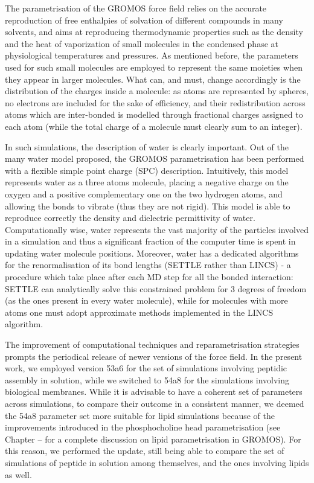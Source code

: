 The parametrisation of the GROMOS force field relies on the accurate reproduction of free enthalpies of solvation of different compounds in many solvents, and aims at reproducing thermodynamic properties such as the density and the heat of vaporization of small molecules in the condensed phase at physiological temperatures and pressures.
%
As mentioned before, the parameters used for such small molecules are employed to represent the same moieties when they appear in larger molecules. What can, and must, change accordingly is the distribution of the charges inside a molecule: as atoms are represented by spheres, no electrons are included for the sake of efficiency, and their redistribution across atoms which are inter-bonded is modelled through fractional charges assigned to each atom (while the total charge of a molecule must clearly sum to an integer).

In such simulations, the description of water is clearly important. Out of the many water model proposed, the GROMOS parametrisation has been performed with a flexible simple point charge (SPC) description. Intuitively, this model represents water as a three atoms molecule, placing a negative charge on the oxygen and a positive complementary one on the two hydrogen atoms, and allowing the bonds to vibrate (thus they are not rigid). This model is able to reproduce correctly the density and dielectric permittivity of water. Computationally wise, water represents the vast majority of the particles involved in a simulation and thus a significant fraction of the computer time is spent in updating water molecule positions.
%
Moreover, water has a dedicated algorithms for the renormalisation of its bond lengths (SETTLE rather than LINCS) - a procedure which take place after each MD step for all the bonded interaction: SETTLE can analytically solve this constrained problem for 3 degrees of freedom (as the ones present in every water molecule), while for molecules with more atoms one must adopt approximate methods implemented in the LINCS algorithm.

The improvement of computational techniques and reparametrisation strategies prompts the periodical release of newer versions of the force field. In the present work, we employed version 53a6 \cite{53a6} for the set of simulations involving peptidic assembly in solution, while we switched to 54a8 \cite{54a8} for the simulations involving biological membranes. While it is advisable to have a coherent set of parameters across simulations, to compare their outcome in a consistent manner, we deemed the 54a8 parameter set more suitable for lipid simulations because of the improvements introduced in the phosphocholine head parametrisation (see Chapter -- for a complete discussion on lipid parametrisation in GROMOS). For this reason, we performed the update, still being able to compare the set of simulations of peptide in solution among themselves, and the ones involving lipids as well.


